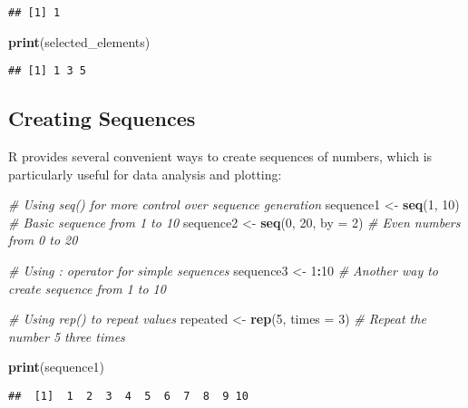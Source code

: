 \documentclass[
]{book}
\newenvironment{Shaded}{\begin{snugshade}}{\end{snugshade}}
\newcommand{\AttributeTok}[1]{\textcolor[rgb]{0.13,0.29,0.53}{#1}}
\newcommand{\CommentTok}[1]{\textcolor[rgb]{0.56,0.35,0.01}{\textit{#1}}}
\newcommand{\DecValTok}[1]{\textcolor[rgb]{0.00,0.00,0.81}{#1}}
\newcommand{\FunctionTok}[1]{\textcolor[rgb]{0.13,0.29,0.53}{\textbf{#1}}}
\newcommand{\NormalTok}[1]{#1}
\newcommand{\OtherTok}[1]{\textcolor[rgb]{0.56,0.35,0.01}{#1}}
\newcommand{\SpecialCharTok}[1]{\textcolor[rgb]{0.81,0.36,0.00}{\textbf{#1}}}
\begin{document}
\begin{verbatim}
## [1] 1
\end{verbatim}

\begin{Shaded}
\begin{Highlighting}[]
\FunctionTok{print}\NormalTok{(selected\_elements)}
\end{Highlighting}
\end{Shaded}

\begin{verbatim}
## [1] 1 3 5
\end{verbatim}

\subsection{Creating Sequences}\label{creating-sequences}

R provides several convenient ways to create sequences of numbers, which is particularly useful for data analysis and plotting:

\begin{Shaded}
\begin{Highlighting}[]
\CommentTok{\# Using seq() for more control over sequence generation}
\NormalTok{sequence1 }\OtherTok{\textless{}{-}} \FunctionTok{seq}\NormalTok{(}\DecValTok{1}\NormalTok{, }\DecValTok{10}\NormalTok{)          }\CommentTok{\# Basic sequence from 1 to 10}
\NormalTok{sequence2 }\OtherTok{\textless{}{-}} \FunctionTok{seq}\NormalTok{(}\DecValTok{0}\NormalTok{, }\DecValTok{20}\NormalTok{, }\AttributeTok{by =} \DecValTok{2}\NormalTok{)  }\CommentTok{\# Even numbers from 0 to 20}

\CommentTok{\# Using : operator for simple sequences}
\NormalTok{sequence3 }\OtherTok{\textless{}{-}} \DecValTok{1}\SpecialCharTok{:}\DecValTok{10}                \CommentTok{\# Another way to create sequence from 1 to 10}

\CommentTok{\# Using rep() to repeat values}
\NormalTok{repeated }\OtherTok{\textless{}{-}} \FunctionTok{rep}\NormalTok{(}\DecValTok{5}\NormalTok{, }\AttributeTok{times =} \DecValTok{3}\NormalTok{)    }\CommentTok{\# Repeat the number 5 three times}

\FunctionTok{print}\NormalTok{(sequence1)}
\end{Highlighting}
\end{Shaded}

\begin{verbatim}
##  [1]  1  2  3  4  5  6  7  8  9 10
\end{verbatim}
\end{document}
